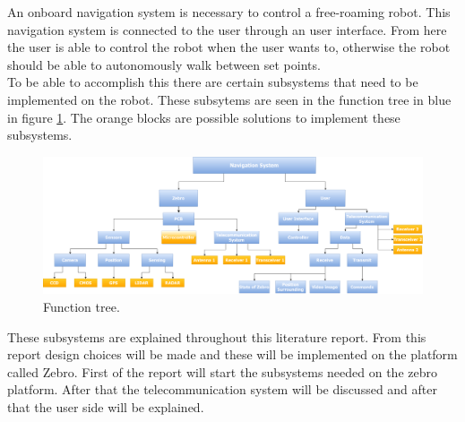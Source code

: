 \documentclass{article}
\begin{document}
An onboard navigation system is necessary to control a free-roaming robot. This navigation system is connected to the user through an user interface. From here the user is able to control the robot when the user wants to, otherwise the robot should be able to autonomously walk between set points.\\
To be able to accomplish this there are certain subsystems that need to be implemented on the robot. These subsytems are seen in the function tree in blue in figure \ref{intro1}. The orange blocks are possible solutions to implement these subsystems.

\begin{figure}[H]
	\centering
	\includegraphics[scale=0.27]{figures/functiontree}
	\caption{Function tree.}
	\label{intro1}
\end{figure}

These subsystems are explained throughout this literature report. From this report design choices will be made and these will be implemented on the platform called Zebro. First of the report will start the subsystems needed on the zebro platform. After that the telecommunication system will be discussed and after that the user side will be explained.
\end{document}
